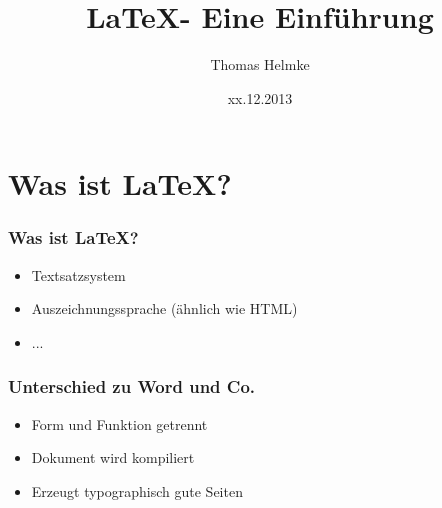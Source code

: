 \documentclass{beamer}
\title{\LaTeX - Eine Einführung}
\author{Thomas Helmke}
\date{xx.12.2013}
\begin{document}
\maketitle
\frame{\tableofcontents}
 
\section{Was ist \LaTeX?}
\begin{frame}[<+->] %
	\frametitle{Was ist \LaTeX?} %
	\begin{itemize}
		\item Textsatzsystem
		\item Auszeichnungssprache (ähnlich wie HTML)
		\item ...
	\end{itemize}
\end{frame}
\begin{frame}[<+->] %
	\frametitle{Unterschied zu Word und Co.} %
	\begin{itemize}
		\item Form und Funktion getrennt
		\item Dokument wird kompiliert
		\item Erzeugt typographisch gute Seiten 
	\end{itemize}
\end{frame}
\end{document}
